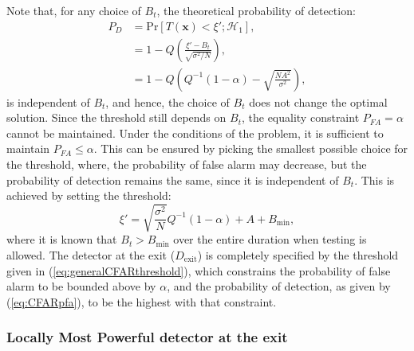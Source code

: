 \documentclass[11pt]{article}
\newcommand{\bx}{\mathbf{x}}
\newcommand{\cH}{\mathcal{H}}
\newcommand{\Prob}{\mathrm{Pr}}
\begin{document}
Note that, for any choice of $B_{t}$, the theoretical probability of detection:
\begin{equation}
\begin{split}
	P_{D} &= \Prob[T(\bx) < \xi';\cH_{1}], \\
	&= 1-Q\left( \frac{\xi'-B_{t}}{\sqrt{\sigma^{2}/N}} \right), \\
	&= 1-Q\left( Q^{-1}(1-\alpha) -\sqrt{\frac{NA^{2}}{\sigma^{2}}} \right),
\end{split}
\label{eq:CFARpd}
\end{equation}
is independent of $B_{t}$, and hence, the choice of $B_{t}$ does not change the optimal solution. Since the threshold still depends on $B_{t}$, the equality constraint $P_{FA}=\alpha$ cannot be maintained. Under the conditions of the problem, it is sufficient to maintain $P_{FA} \leq \alpha$. This can be ensured by picking the smallest possible choice for the threshold, where, the probability of false alarm may decrease, but the probability of detection remains the same, since it is independent of $B_{t}$. This is achieved by setting the threshold:
\begin{equation}
	\xi' = \sqrt{\frac{\sigma^{2}}{N}} Q^{-1}(1-\alpha) + A + B_{\text{min}},
\label{eq:generalCFARthreshold}
\end{equation}
where it is known that $B_{t}>B_{\text{min}}$ over the entire duration when testing is allowed. The detector at the exit ($D_{\text{exit}}$) is completely specified by the threshold given in (\ref{eq:generalCFARthreshold}), which constrains the probability of false alarm to be bounded above by $\alpha$, and the probability of detection, as given by (\ref{eq:CFARpfa}), to be the highest with that constraint.


\subsubsection{Locally Most Powerful detector at the exit}
\label{subsubsec:exitLMPdetector}
\end{document}
